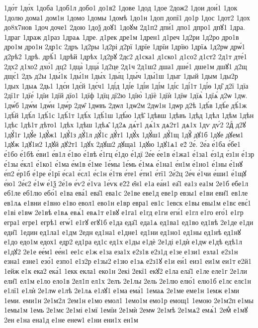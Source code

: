 {1до́т
1до́х
1доба
1доб1л
добо1
до1в2
1дове
1дод
1дое
2дож2
1дои
дои́1
1док
1долю
дома1
дом1н
1домо
1домы
1домѣ
1до1н
1доп
допї1
до1р
1дос
1дот2
1дох
до8х7нов
1доч
доче1
2дою
1доѯ
доꙋ1
1доꙋм
2д1п2
дпи́1
дпо1
дпро1
дпꙋ1
1дра.
1драг
1драж
д1раз
1драѧ
1дре.
д1рек
дре1м
1дрен1
д1реч
1д2ри
1д2ро
дро1в
дро1м
дро1н
2др1с
2дръ
1д2ры
1д2рі
д2рї
1дрїе
1дрїи
1дрїю
1дрїѧ
1д2рѡ
дрѡ́1
д2рѣ2
1дрѣ.
дрѣ́1
1дрѣй
1дрѣх
1д2рꙋ
2дс2
д1ска1
д1ско1
д1со2
д1ст2
2д1т
дте́1
2дх2
д1хо2
дхо́1
дц2
1дца̀
1дца́
1д2це
2д1ч
2д1ш2
дша1
дше́1
дше1м
дшꙋ1
д2щ
дщє́1
2дъ
д2ы
1ды́1к
1ды́1н
1ды́х
1ды́ц
1ды́ч
1ды́1ш
1дыг
1дый
1дым
1ды2р
1дых
1дыѧ
2дь1
1дє́и
1дє́й
1дє́ч1
1ді́д
1ді́е
1ді́и
1ді́м
1ді́с
1ді́1т
1ді́ѳ
1ді̑
д2ї
1дїа
2дї1г
1дїе́
1дїи
1дїй
дїо1
1дїф
1дїц
дї2ю
1дїю̀
1дїѐ
1дїѝ
1дїѡ
1дїѧ̀
1дїѧ́
д2ѡ
1дѡ.
1дѡ́б
1дѡ́м
1дѡ́н
1дѡ́р
2дѡ̑
1дѡвъ
2дѡл
1дѡ2м
2дѡ1н
1дѡр
д2ѣ
1дѣ́в
1дѣ́е
дѣ́1ж
1дѣ́й
1дѣ́л
1дѣ́1с
1дѣ́1т
1дѣ́х
1дѣ́1ш
1дѣ́ю
1дѣ̑
1дѣвш
1дѣвъ
1дѣд
1дѣл
1дѣм
1дѣн
1дѣс
1дѣ1т
дѣто1
1дѣх
1дѣш
1дѣѧ̑
1д2ѧ
дѧ́т1
дѧ́1х
дѧ2т1
дѧ1х
1дѵ
дѵ́2
2дⷧ
д2ꙋ
1дꙋ́1г
1дꙋ́е
1дꙋ́ж1
1дꙋ́1з
дꙋ́1л
дꙋ́1с
дꙋ́т1
1дꙋ́х
1дꙋ́ш1
дꙋ́1щ
1дꙋ̑
дꙋ1б
1дꙋе
дꙋем1
1дꙋж
1дꙋ1и2
1дꙋй
дꙋ2т1
1дꙋх
2дꙋш2
дꙋща1
1дꙋю
1дꙋ1ѧ1
е2́
2е́.
2е́а
е́1ба
е́бе1
е́1бо
е́1бѣ
е́ви1
е́в1л
е́1во
е́1вѣ
е́1гц
е́1до
е́1дї
2е́е
е́е1в
е́1жа1
е́1за1
е́з1д
е́з1н
е́1зр
е́1зы
е́кл1
е́1ко1
е́1ма
е́м1в
е́1ме
1е́мы
1е́мь
е́1мѧ
е́1на1
е́н1м
е́1но1
е́1ны
е́1нꙋ
е́п2
е́р1б
е́1ре
е́1рї
е́са1
е́сл1
е́с1н
е́1тв
е́те1
е́ти1
е́тї1
2е́2ц
2е́ч
е́1чи
е́ши1
е́1щꙋ
е́ю1
2е́є2
е́1ѡ
е́1ѯ
2е́1ѳ
е́ѵ2
е́1ѵа
1е́ѵк
е2̑2
е̑н1
е1а
еа́н1
еа̑1
еа1з
еа1м
2е1б
ебе1л
еб1ле
еб1лю
ебо́1
е1ва
ева́1
ева̑1
ева1с
2е1ве
еве1д
еве1р
евзы1
е1ви
еви̑1
ев1ле
ев1лѧ
е1вни
е1вно
е1во
евол1
ево1н
е1вр
евра1
ев1с
1евск
е1вы
евы1м
е1вє
евє́1
е1ві
е1вѡ
2е1вѣ
е1вѧ
евѧ́1
евѧ1т
е1вꙋ
е1га1
е1гд
е1ги
еги́1
е1гл
е1го
его́1
е1гр
егра1
егре1
егрѣ1
егѡ́1
е1гꙋ
егꙋ1б
е1да
еда̑1
еда1ѧ
ед1ва1
ед1во
ед1вѣ
2е1де
е1ди
еди̑1
1един
ед1ла1
е1дм
2едн
ед1на1
е1дне1
ед1ни
ед1но1
ед1ны
ед1нѣ
ед1нꙋ
е1до
едо1м
едох1
едр2
ед1ра
ед1с
ед1х
е1ды
е1дѐ
2е1ді
е1дѝ
е1дѡ
е1дѣ
едѣ1л
е1дꙋ2
2е1е
ее́м1
ее́н1
ее1с
е1ж
е1за
еза1х
е2з1в
е2з1д
е1зе
е1зи1
езла1
е2з1н
езна1
езне1
езо́1
езпо1
е1з2р
е1зы2
е1зю
е1зѧ
е2з1ꙋ
е1и
еи́1
еиз1
еи1м
еи1т
е2й1
1ейж
е1к
ека2
ека́1
1екк
екла1
еко1н
2екі
2екї1
екꙋ2
е1ла
ела̑1
е1ле
еле1г
2е1ли
ели̑1
ел1м
е1ло
ело1в
2ел1п
ел1х
2елъ
2е1лы
2ель
2е1лю
елю́1
елю1б
е1лє
елє1н
е1лї1
е1лѝ
2е1лѡ
е1лѣ
2е1лѧ
е1лꙋ1
е1ма
ема́1
1емаѧ
2е1ме
еме1н
1емж
е1ми
1еми.
еми1н
2е1м2л
2ем1н
е1мо
емол1
1емо1м
емо1р
емощ1
1емою
2е1м2п
е1мы
1емы1м
1емь
2е1мє
2е1мі
е1мї
1емїи
2е1мѝ
2емѡ
2е1мѣ
2е1мѧ2
емѧ́1
2емⷣ
е1мꙋ
2ен
е1на
ена1д
е1не
енеѡ1
е1ни
ени1х
ен1м
}
